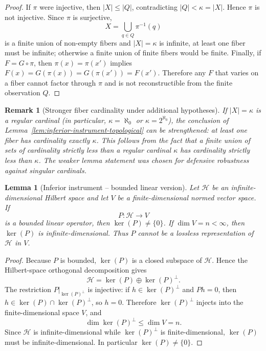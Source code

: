 \documentclass[11pt]{article}
\newtheorem{lemma}{Lemma}
\newtheorem{remark}{Remark}
\begin{document}
\begin{proof}
If $\pi$ were injective, then $|X|\leq |Q|$, contradicting $|Q|<\kappa=|X|$. Hence $\pi$ is not injective. Since $\pi$ is surjective,
\[
X=\bigcup_{q\in Q}\pi^{-1}(q)
\]
is a finite union of non-empty fibers and $|X|=\kappa$ is infinite, at least one fiber must be infinite; otherwise a finite union of finite fibers would be finite. Finally, if $F=G\circ\pi$, then $\pi(x)=\pi(x')$ implies $F(x)=G(\pi(x))=G(\pi(x'))=F(x')$. Therefore any $F$ that varies on a fiber cannot factor through $\pi$ and is not reconstructible from the finite observation $Q$.
\end{proof}

\begin{remark}[Stronger fiber cardinality under additional hypotheses]\label{rem:stronger-fiber-cardinality}
If $|X|=\kappa$ is a regular cardinal (in particular, $\kappa=\aleph_0$ or $\kappa=2^{\aleph_0}$), the conclusion of Lemma~\ref{lem:inferior-instrument-topological} can be strengthened: at least one fiber has cardinality exactly $\kappa$. This follows from the fact that a finite union of sets of cardinality strictly less than a regular cardinal $\kappa$ has cardinality strictly less than $\kappa$. The weaker lemma statement was chosen for defensive robustness against singular cardinals.
\end{remark}

\begin{lemma}[Inferior instrument -- bounded linear version]\label{lem:inferior-instrument-linear}
Let $\mathcal{H}$ be an infinite-dimensional Hilbert space and let $V$ be a finite-dimensional normed vector space. If
\[
P\colon\mathcal{H}\to V
\]
is a bounded linear operator, then $\ker(P)\neq\{0\}$. If $\dim V=n<\infty$, then $\ker(P)$ is infinite-dimensional. Thus $P$ cannot be a lossless representation of $\mathcal{H}$ in $V$.
\end{lemma}

\begin{proof}
Because $P$ is bounded, $\ker(P)$ is a closed subspace of $\mathcal{H}$. Hence the Hilbert-space orthogonal decomposition gives
\[
\mathcal{H}=\ker(P)\oplus\ker(P)^{\perp}.
\]
The restriction $P|_{\ker(P)^{\perp}}$ is injective: if $h\in\ker(P)^{\perp}$ and $P h=0$, then $h\in\ker(P)\cap\ker(P)^{\perp}$, so $h=0$. Therefore $\ker(P)^{\perp}$ injects into the finite-dimensional space $V$, and
\[
\dim\ker(P)^{\perp}\leq \dim V=n.
\]
Since $\mathcal{H}$ is infinite-dimensional while $\ker(P)^{\perp}$ is finite-dimensional, $\ker(P)$ must be infinite-dimensional. In particular $\ker(P)\neq\{0\}$.
\end{proof}
\end{document}
